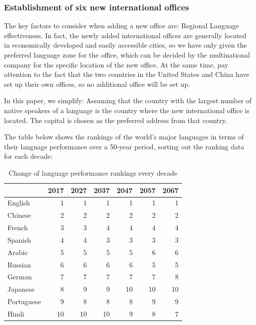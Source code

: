 \subsubsection{Establishment of six new international offices} 
\noindent The key factors to consider when adding a new office are: Regional Language effectiveness. In fact, the newly added international offices are generally located in economically developed and easily accessible cities, so we have only given the preferred language zone for the office, which can be decided by the multinational company for the specific location of the new office. At the same time, pay attention to the fact that the two countries in the United States and China have set up their own offices, so no additional office will be set up.
\par In this paper, we simplify: Assuming that the country with the largest number of native speakers of a language is the country where the new international office is located. The capital is chosen as the preferred address from that country.
\par The table below shows the rankings of the world's major languages in terms of their language performance over a 50-year period, sorting out the ranking data for each decade:

\begin{table}[H]
	\centering
	\caption{Change of language performance rankings every decade}
	\begin{tabular}{|p{5.22em}|r|r|r|r|r|r|}
		\toprule
		\multicolumn{1}{|r|}{\backslashbox[0pt][l]{Language}{Year}} & 2017  & 2027  & 2037  & 2047  & 2057  & 2067 \\
		\midrule
		English & 1     & 1     & 1     & 1     & 1     & 1 \\
		\midrule
		Chinese & 2     & 2     & 2     & 2     & 2     & 2 \\
		\midrule
		French & 3     & 3     & 4     & 4     & 4     & 4 \\
		\midrule
		Spanish & 4     & 4     & 3     & 3     & 3     & 3 \\
		\midrule
		Arabic & 5     & 5     & 5     & 5     & 6     & 6 \\
		\midrule
		Russian & 6     & 6     & 6     & 6     & 5     & 5 \\
		\midrule
		German & 7     & 7     & 7     & 7     & 7     & 8 \\
		\midrule
		Japanese & 8     & 9     & 9     & 10    & 10    & 10 \\
		\midrule
		Portuguese & 9     & 8     & 8     & 8     & 9     & 9 \\
		\midrule
		Hindi & 10    & 10    & 10    & 9     & 8     & 7 \\
		\bottomrule
	\end{tabular}%
	\label{tab:Change}%
\end{table}%

